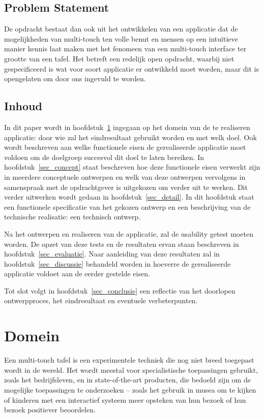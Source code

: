 \documentclass{acm}
\begin{document}
\subsection{Problem Statement}
De opdracht bestaat dan ook uit het ontwikkelen van een applicatie dat de mogelijkheden van multi-touch ten volle benut en mensen op een intu\"itieve manier kennis laat maken met het fenomeen van een multi-touch interface ter grootte van een tafel. Het betreft een redelijk open opdracht, waarbij niet gespecificeerd is wat voor soort applicatie er ontwikkeld moet worden, maar dit is opengelaten om door ons ingevuld te worden.

\subsection{Inhoud}
In dit paper wordt in hoofdstuk~\ref{sec_domein} ingegaan op het domein van de te realiseren applicatie: door wie zal het eindresultaat gebruikt worden en met welk doel. Ook wordt beschreven aan welke functionele eisen de gerealiseerde applicatie moet voldoen om de doelgroep succesvol dit doel te laten bereiken. In hoofdstuk~\ref{sec_concept} staat beschreven hoe deze functionele eisen verwerkt zijn in meerdere conceptuele ontwerpen en welk van deze ontwerpen vervolgens in samenspraak met de opdrachtgever is uitgekozen om verder uit te werken. Dit verder uitwerken wordt gedaan in hoofdstuk~\ref{sec_detail}. In dit hoofdstuk staat een functionele specificatie van het gekozen ontwerp en een beschrijving van de technische realisatie: een technisch ontwerp.

Na het ontwerpen en realiseren van de applicatie, zal de usability getest moeten worden. De opzet van deze tests en de resultaten ervan staan beschreven in hoofdstuk~\ref{sec_evaluatie}. Naar aanleiding van deze resultaten zal in hoofdstuk~\ref{sec_discussie} behandeld worden in hoeverre de gerealiseerde applicatie voldoet aan de eerder gestelde eisen.

Tot slot volgt in hoofdstuk~\ref{sec_conclusie} een reflectie van het doorlopen ontwerpproces, het eindresultaat en eventuele verbeterpunten.

\section{Domein}
\label{sec_domein}
Een multi-touch tafel is een experimentele techniek die nog niet breed toegepast wordt in de wereld. Het wordt meestal voor specialistische toepassingen gebruikt, zoals het bedrijfsleven, en in state-of-the-art producten, die bedoeld zijn om de mogelijke toepassingen te onderzoeken -- zoals het gebruik in musea om te kijken of kinderen met een interactief systeem meer opsteken van hun bezoek of hun bezoek positiever beoordelen.
\end{document}
